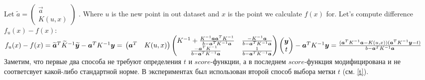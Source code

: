 \documentclass{llncs}
\begin{document}
Let $\widetilde{a} = \begin{pmatrix}
\vec{a} \\
K(u,x)
\end{pmatrix} $ . Where $u$ is the new point in out dataset and $x$ is the point we calculate $f(x)$ for.
Let's compute difference $f_u(x) - f(x)$:\\
$
f_u(x) - f(x) = \vec{\widetilde{a}}^T\widetilde{K}^{-1}\vec{\widetilde{y}} - \vec{a}^TK^{-1}\vec{y} = \\
\begin{pmatrix}
\vec{a}^T & K(u,x)
\end{pmatrix}
\begin{pmatrix}
K^{-1} + \frac{K^{-1}\vec{a}\vec{a}^TK^{-1}}{b-\vec{a}^TK^{-1}\vec{a}} & 
\frac{-K^{-1}\vec{a}}{b-\vec{a}^TK^{-1}\vec{a}} \\
\frac{-\vec{a}^TK^{-1}}{b-\vec{a}^TK^{-1}\vec{a}} & \frac{1}{b-\vec{a}^TK^{-1}\vec{a}} \\
\end{pmatrix}
\begin{pmatrix}
\vec{y} \\
t
\end{pmatrix} - \vec{a}^TK^{-1}\vec{y} = \\
\frac{(\vec{a}^TK^{-1}\vec{a} - K(u,x))(\vec{a}^TK^{-1}\vec{y} - t)}{b - \vec{a}^TK^{-1}\vec{a}}
$
\\
Заметим, что первые два способа не требуют определения $t$ и $score$-функции, а в последнем $score$-функция модифицирована и не соответсвует какой-либо стандартной норме. В экспериментах был использован второй способ выбора метки $t$ (см. \eqref{t}).
\end{document}
